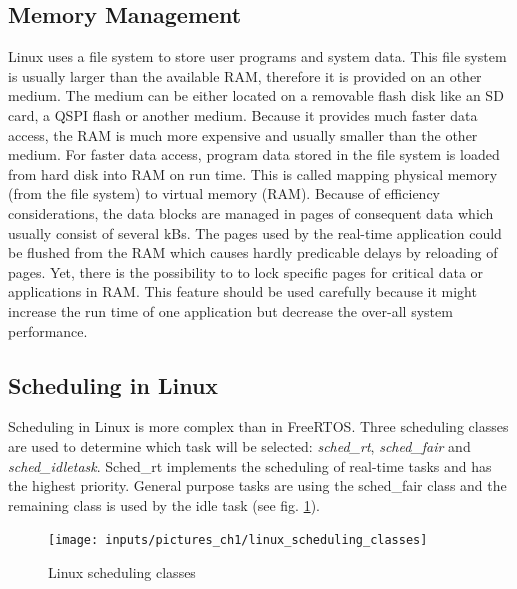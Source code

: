 \subsection{Memory Management}
Linux uses a file system to store user programs and system data. 
This file system is usually larger than the available \ac{RAM}, therefore it is provided on an other medium.
The medium can be either located on a removable flash disk like an \ac{SD} card, a \ac{QSPI} flash or another medium.
Because it provides much faster data access, the \ac{RAM} is much more expensive and usually smaller than the other medium. 
For faster data access, program data stored in the file system is loaded from hard disk into \ac{RAM} on run time.
This is called mapping physical memory (from the file system) to virtual memory (\ac{RAM}).
Because of efficiency considerations, the data blocks are managed in pages of consequent data which usually consist of several kBs.
The pages used by the real-time application could be flushed from the \ac{RAM} which causes hardly predicable delays by reloading of pages.
Yet, there is the possibility to to lock specific pages for critical data or applications in \ac{RAM}.
This feature should be used carefully because it might increase the run time of one application but decrease the over-all system performance.   

\subsection{Scheduling in Linux}\label{ss_scheduling_in_linux} 
Scheduling in Linux \cite{love:lkd} \cite{jones:itlcfss} is more complex than in FreeRTOS.
Three scheduling classes are used to determine which task will be selected: \textit{sched\_rt}, \textit{sched\_fair} and \textit{sched\_idletask}.
Sched\_rt implements the scheduling of real-time tasks and has the highest priority. 
General purpose tasks are using the sched\_fair class and the remaining class is used by the idle task (see fig. \ref{fig_linux_scheduling_classes}).

\begin{figure}[htb]
	\begin{center}
		\texttt{[image: inputs/pictures\_ch1/linux\_scheduling\_classes]}
	\end{center}
	\caption[Linux scheduling classes]{Linux scheduling classes \cite{jones:itlcfss}} \label{fig_linux_scheduling_classes}
\end{figure}

